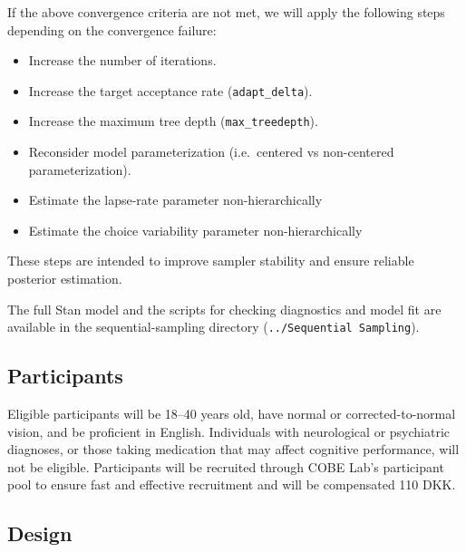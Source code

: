 \documentclass[
]{article}
\providecommand{\tightlist}{%
  \setlength{\itemsep}{0pt}\setlength{\parskip}{0pt}}
\begin{document}
If the above convergence criteria are not met, we will apply the
following steps depending on the convergence failure:

\begin{itemize}
\tightlist
\item
  Increase the number of iterations.
\item
  Increase the target acceptance rate (\texttt{adapt\_delta}).
\item
  Increase the maximum tree depth (\texttt{max\_treedepth}).
\item
  Reconsider model parameterization (i.e.~centered vs non-centered
  parameterization).
\item
  Estimate the lapse-rate parameter non-hierarchically
\item
  Estimate the choice variability parameter non-hierarchically
\end{itemize}

These steps are intended to improve sampler stability and ensure
reliable posterior estimation.

The full Stan model and the scripts for checking diagnostics and model
fit are available in the sequential-sampling directory
(\texttt{../Sequential\ Sampling}).

\subsection{Participants}\label{participants}

Eligible participants will be 18--40 years old, have normal or
corrected-to-normal vision, and be proficient in English. Individuals
with neurological or psychiatric diagnoses, or those taking medication
that may affect cognitive performance, will not be eligible.
Participants will be recruited through COBE Lab's participant pool to
ensure fast and effective recruitment and will be compensated 110 DKK.

\subsection{Design}\label{design}
\end{document}
